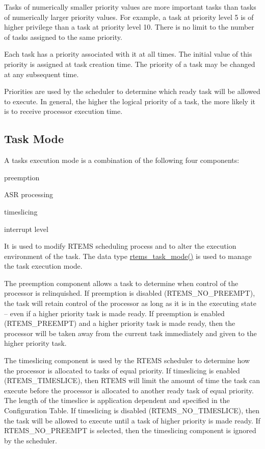 Tasks of numerically smaller priority values are more important tasks than tasks of numerically larger priority values. For example, a task at priority level 5 is of higher privilege than a task at priority level 10. There is no limit to the number of tasks assigned to the same priority.

Each task has a priority associated with it at all times. The initial value of this priority is assigned at task creation time. The priority of a task may be changed at any subsequent time.

Priorities are used by the scheduler to determine which ready task will be allowed to execute. In general, the higher the logical priority of a task, the more likely it is to receive processor execution time.\hypertarget{group__ClassicTasks_ClassicTasksSecTaskMode}{}\subsection{Task Mode}\label{group__ClassicTasks_ClassicTasksSecTaskMode}
A task\textquotesingle{}s execution mode is a combination of the following four components\+:


\begin{DoxyItemize}
\item preemption
\item A\+SR processing
\item timeslicing
\item interrupt level
\end{DoxyItemize}

It is used to modify R\+T\+E\+MS\textquotesingle{} scheduling process and to alter the execution environment of the task. The data type \mbox{\hyperlink{group__ClassicTasks_gad74c115e94d1f65c416444b36bf012bf}{rtems\+\_\+task\+\_\+mode()}} is used to manage the task execution mode.

The preemption component allows a task to determine when control of the processor is relinquished. If preemption is disabled ({\ttfamily R\+T\+E\+M\+S\+\_\+\+N\+O\+\_\+\+P\+R\+E\+E\+M\+PT}), the task will retain control of the processor as long as it is in the executing state -- even if a higher priority task is made ready. If preemption is enabled ({\ttfamily R\+T\+E\+M\+S\+\_\+\+P\+R\+E\+E\+M\+PT}) and a higher priority task is made ready, then the processor will be taken away from the current task immediately and given to the higher priority task.

The timeslicing component is used by the R\+T\+E\+MS scheduler to determine how the processor is allocated to tasks of equal priority. If timeslicing is enabled ({\ttfamily R\+T\+E\+M\+S\+\_\+\+T\+I\+M\+E\+S\+L\+I\+CE}), then R\+T\+E\+MS will limit the amount of time the task can execute before the processor is allocated to another ready task of equal priority. The length of the timeslice is application dependent and specified in the Configuration Table. If timeslicing is disabled ({\ttfamily R\+T\+E\+M\+S\+\_\+\+N\+O\+\_\+\+T\+I\+M\+E\+S\+L\+I\+CE}), then the task will be allowed to execute until a task of higher priority is made ready. If {\ttfamily R\+T\+E\+M\+S\+\_\+\+N\+O\+\_\+\+P\+R\+E\+E\+M\+PT} is selected, then the timeslicing component is ignored by the scheduler.

